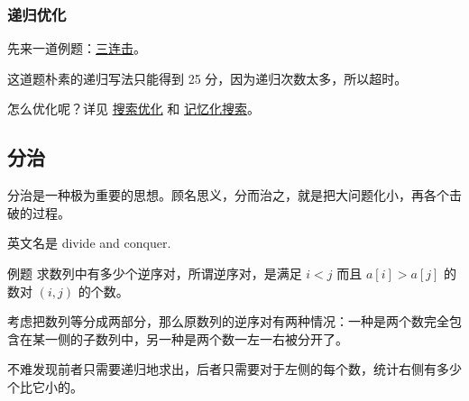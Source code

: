 \subsubsection{递归优化}

先来一道例题：\href{https://www.luogu.org/problemnew/show/P1618}{三连击}。

这道题朴素的递归写法只能得到 25 分，因为递归次数太多，所以超时。

怎么优化呢？详见 \href{/search/optimization}{搜索优化} 和 \href{/dp/memo/}{记忆化搜索}。

\subsection{分治}

分治是一种极为重要的思想。顾名思义，分而治之，就是把大问题化小，再各个击破的过程。

英文名是 divide and conquer.

\begin{NOTE}{例题}{}
求数列中有多少个逆序对，所谓逆序对，是满足 $i < j$ 而且 $a[i] > a[j]$ 的数对 $(i, j)$ 的个数。
\end{NOTE}


考虑把数列等分成两部分，那么原数列的逆序对有两种情况：一种是两个数完全包含在某一侧的子数列中，另一种是两个数一左一右被分开了。

不难发现前者只需要递归地求出，后者只需要对于左侧的每个数，统计右侧有多少个比它小的。
